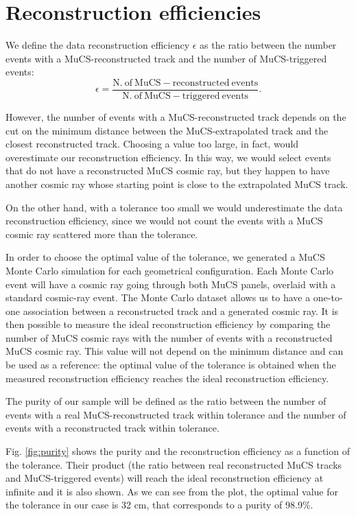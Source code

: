 \documentclass[a4paper]{scrartcl}
\begin{document}
\section{Reconstruction efficiencies}\label{sec:reco}
We define the data reconstruction efficiency $\epsilon$ as the ratio between the number events with a MuCS-reconstructed track and the number of MuCS-triggered events:
\begin{equation}
  \epsilon = \frac{\mathrm{N.~of~MuCS-reconstructed~events}}{\mathrm{N.~of~MuCS-triggered~events}}.
\end{equation}

However, the number of events with a MuCS-reconstructed track depends on the cut on the minimum distance between the MuCS-extrapolated track and the closest reconstructed track. Choosing a value too large, in fact, would overestimate our reconstruction efficiency. In this way, we would select events that do not have a reconstructed MuCS cosmic ray, but they happen to have another cosmic ray whose starting point is close to the extrapolated MuCS track.

On the other hand, with a tolerance too small we would underestimate the data reconstruction efficiency, since we would not count the events with a MuCS cosmic ray scattered more than the tolerance.

In order to choose the optimal value of the tolerance, we generated a MuCS Monte Carlo simulation for each geometrical configuration. Each Monte Carlo event will have a cosmic ray going through both MuCS panels, overlaid with a standard cosmic-ray event. The Monte Carlo dataset allows us to have a one-to-one association between a reconstructed track and a generated cosmic ray. It is then possible to measure the ideal reconstruction efficiency by comparing the number of MuCS cosmic rays with the number of events with a reconstructed MuCS cosmic ray. This value will not depend on the minimum distance and can be used as a reference: the optimal value of the tolerance is obtained when the measured reconstruction efficiency reaches the ideal reconstruction efficiency.

The purity of our sample will be defined as the ratio between the number of events with a real MuCS-reconstructed track within tolerance and the number of events with a reconstructed track within tolerance.

Fig. \ref{fig:purity} shows the purity and the reconstruction efficiency as a function of the tolerance. Their product (the ratio between real reconstructed MuCS tracks and MuCS-triggered events) will reach the ideal reconstruction efficiency at infinite and it is also shown. As we can see from the plot, the optimal value for the tolerance in our case is 32 cm, that corresponds to a purity of 98.9\%.
\end{document}
